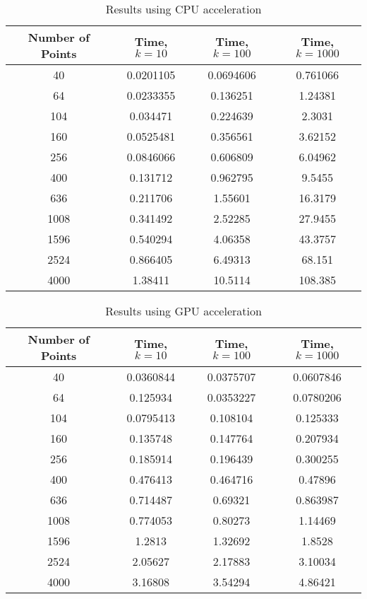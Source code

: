 \begin{table}[ht]
    \centering
    \begin{tabular}{| c | c c c |}
        \hline
        Number of Points & Time, $k=10$ &  Time, $k=100$ &   Time, $k=1000$ \\
        \hline
        40  &  0.0201105   &   0.0694606    &    0.761066 \\
        64  &  0.0233355   &   0.136251     &    1.24381 \\
       104  &  0.034471    &   0.224639     &    2.3031 \\
       160  &  0.0525481   &   0.356561     &    3.62152 \\
       256  &  0.0846066   &   0.606809     &    6.04962 \\
       400  &  0.131712    &   0.962795     &    9.5455 \\
       636  &  0.211706    &   1.55601      &   16.3179 \\
      1008  &  0.341492    &   2.52285      &   27.9455 \\
      1596  &  0.540294    &   4.06358      &   43.3757 \\
      2524  &  0.866405    &   6.49313      &   68.151 \\
      4000  &  1.38411     &  10.5114       &  108.385 \\
      \hline
    \end{tabular}
    \caption{Results using CPU acceleration}
    \label{tb:cpu}
\end{table}

\begin{table}[ht]
    \centering
    \begin{tabular}{| c | c c c |}
        \hline
        Number of Points & Time, $k=10$ & Time, $k=100$ & Time, $k=1000$ \\
        \hline
        40  &  0.0360844   &  0.0375707    &  0.0607846 \\
        64  &  0.125934    &  0.0353227    &  0.0780206 \\
       104  &  0.0795413   &  0.108104     &  0.125333 \\
       160  &  0.135748    &  0.147764     &  0.207934 \\
       256  &  0.185914    &  0.196439     &  0.300255 \\
       400  &  0.476413    &  0.464716     &  0.47896 \\
       636  &  0.714487    &  0.69321      &  0.863987 \\ 
      1008  &  0.774053    &  0.80273      &  1.14469 \\ 
      1596  &  1.2813      &  1.32692      &  1.8528 \\
      2524  &  2.05627     &  2.17883      &  3.10034 \\
      4000  &  3.16808     &  3.54294      &  4.86421 \\
      \hline
    \end{tabular}
    \caption{Results using GPU acceleration}
    \label{tb:gpu}
\end{table}

